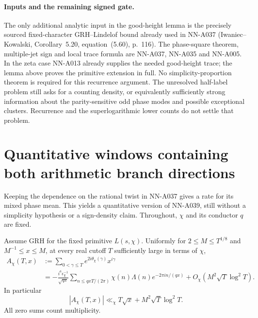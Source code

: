 \paragraph{Inputs and the remaining signed gate.}
The only additional analytic input in the good-height lemma is the
precisely sourced fixed-character GRH--Lindelof bound already used in
NN-A037 (Iwaniec--Kowalski, Corollary~5.20, equation~(5.60),
p.~116). The phase-square theorem, multiple-jet sign and local
trace formula are NN-A037, NN-A035 and NN-A005. In the zeta
case NN-A013 already supplies the needed good-height trace;
the lemma above proves the primitive extension in full.
No simplicity-proportion theorem is required for this recurrence
argument. The unresolved half-label problem still asks for a
counting density, or equivalently sufficiently strong information
about the parity-sensitive odd phase modes and possible
exceptional clusters. Recurrence and the superlogarithmic lower
counts do not settle that problem.


\section{Quantitative windows containing both arithmetic branch directions}
\label{sec:analytic-quantitative-signed-windows}

Keeping the dependence on the rational twist in NN-A037 gives a
rate for its mixed phase mean. This yields a quantitative version
of NN-A039, still without a simplicity hypothesis or a sign-density
claim. Throughout, $\chi$ and its conductor $q$ are fixed.

\begin{lemma}
\label{lem:A040-uniform-twist}
Assume GRH for the fixed primitive $L(s,\chi)$. Uniformly for
$2\le M\le T^{1/8}$ and $M^{-1}\le x\le M$, at every real
cutoff $T$ sufficiently large in terms of $\chi$,
\begin{align}\label{eq:A040-uniform-twist}
 A_\chi(T,x)&:=\sum_{0<\gamma\le T}
              e^{2i\theta_\chi(\gamma)}x^{i\gamma}\\
 &=-\frac{i^a\epsilon_\chi^{-1}}{\sqrt{qx}}
       \sum_{n\le qxT/(2\pi)}
                  \chi(n)\Lambda(n)e^{-2\pi in/(qx)}
       +O_\chi(M^2\sqrt T\log^2T).\nonumber
\end{align}
In particular
\begin{equation}\label{eq:A040-uniform-bound}
 |A_\chi(T,x)|\ll_\chi
             T\sqrt x+M^2\sqrt T\log^2T.
\end{equation}
All zero sums count multiplicity.
\end{lemma}

